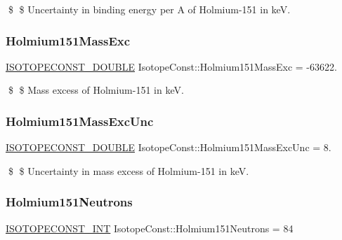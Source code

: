 \$ \$ Uncertainty in binding energy per A of Holmium-\/151 in keV. \mbox{\label{group___isotope_const-_holmium-_ho151_ga42e6ea5f49b183c026bea18cd736cd84}} 
\subsubsection{\texorpdfstring{Holmium151\+Mass\+Exc}{Holmium151MassExc}}
{\footnotesize\ttfamily \mbox{\hyperlink{group___isotope_const-_macros_ga8f45a7272ce02c0b4c65c44636ed719a}{I\+S\+O\+T\+O\+P\+E\+C\+O\+N\+S\+T\+\_\+\+D\+O\+U\+B\+LE}} Isotope\+Const\+::\+Holmium151\+Mass\+Exc = -\/63622.}

\$ \$ Mass excess of Holmium-\/151 in keV. \mbox{\label{group___isotope_const-_holmium-_ho151_ga6b1ce228a2f6dd305a60acf054f2b15d}} 
\subsubsection{\texorpdfstring{Holmium151\+Mass\+Exc\+Unc}{Holmium151MassExcUnc}}
{\footnotesize\ttfamily \mbox{\hyperlink{group___isotope_const-_macros_ga8f45a7272ce02c0b4c65c44636ed719a}{I\+S\+O\+T\+O\+P\+E\+C\+O\+N\+S\+T\+\_\+\+D\+O\+U\+B\+LE}} Isotope\+Const\+::\+Holmium151\+Mass\+Exc\+Unc = 8.}

\$ \$ Uncertainty in mass excess of Holmium-\/151 in keV. \mbox{\label{group___isotope_const-_holmium-_ho151_gabb640538f16d1656ce940c818d338071}} 
\subsubsection{\texorpdfstring{Holmium151\+Neutrons}{Holmium151Neutrons}}
{\footnotesize\ttfamily \mbox{\hyperlink{group___isotope_const-_macros_ga5f18360b3e99483a35c32d789e62621c}{I\+S\+O\+T\+O\+P\+E\+C\+O\+N\+S\+T\+\_\+\+I\+NT}} Isotope\+Const\+::\+Holmium151\+Neutrons = 84}

